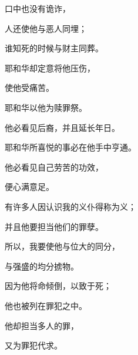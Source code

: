 {\par }{\Q 口中也没有诡诈，
\par }{\Q 人还使他与恶人同埋；
\par }{\Q 谁知死的时候与财主同葬。
\par }{\BB \par }{\Q {}耶和华却定意将他压伤，
\par }{\Q 使他受痛苦。
\par }{\Q 耶和华以他为赎罪祭。
\par }{\Q 他必看见后裔，并且延长年日。
\par }{\Q 耶和华所喜悦的事必在他手中亨通。
\par }{\Q {}他必看见自己劳苦的功效，
\par }{\Q 便心满意足。
\par }{\Q 有许多人因认识我的义仆得称为义；
\par }{\Q 并且他要担当他们的罪孽。
\par }{\Q {}所以，我要使他与位大的同分，
\par }{\Q 与强盛的均分掳物。
\par }{\Q 因为他将命倾倒，以致于死；
\par }{\Q 他也被列在罪犯之中。
\par }{\Q 他却担当多人的罪，
\par }{\Q 又为罪犯代求。

}
